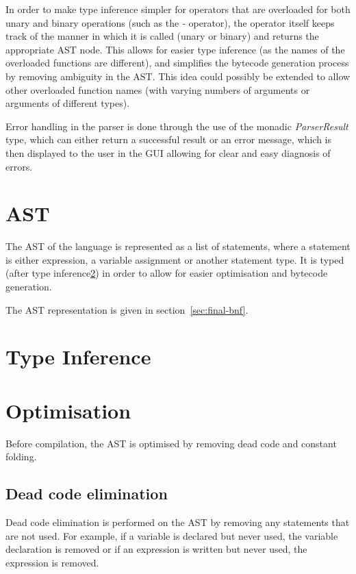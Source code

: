 In order to make type inference simpler for operators that are overloaded for both unary and binary operations (such 
as the \textit{-} operator), the operator itself keeps track of the manner in which it is called (unary or binary) and
returns the appropriate AST node. 
This allows for easier type inference (as the names of the overloaded functions are different), 
and simplifies the bytecode generation process by removing ambiguity in the AST\@.
This idea could possibly be extended to allow other overloaded function names (with varying numbers of arguments or 
arguments of different types).

Error handling in the parser is done through the use of the monadic \textit{ParserResult} type, which can either 
return a successful result or an error message, which is then displayed to the user in the GUI allowing for clear 
and easy diagnosis of errors.

\section{AST}\label{sec:expression}

The AST of the language is represented as a list of statements, where a statement is either expression, a
variable assignment or another statement type.
It is typed (after type inference\ref{sec:type-inference}) in order to allow for easier optimisation and
bytecode generation.

The AST representation is given in section~\ref{sec:final-bnf}.

\section{Type Inference}\label{sec:type-inference}


\section{Optimisation}\label{sec:optimisation}

Before compilation, the AST is optimised by removing dead code and constant folding.

\subsection{Dead code elimination}\label{subsec:dead-code-elimination}

Dead code elimination is performed on the AST by removing any statements that are not used.
For example, if a variable is declared but never used, the variable declaration is removed or if an expression is
written but never used, the expression is removed.

